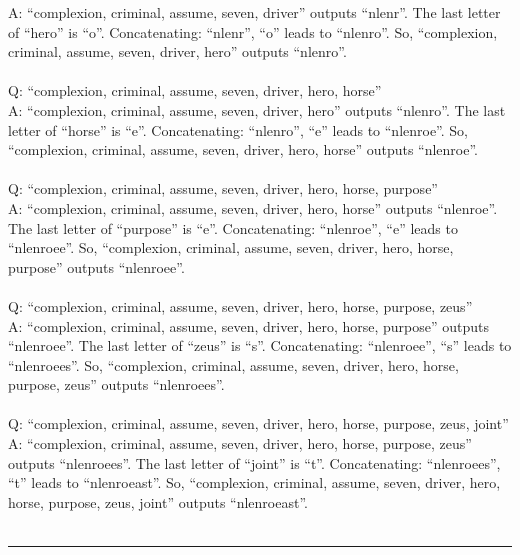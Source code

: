 {A: ``complexion, criminal, assume, seven, driver'' outputs ``nlenr''. The last letter of ``hero'' is ``o''. Concatenating: ``nlenr'', ``o'' leads to ``nlenro''. So, ``complexion, criminal, assume, seven, driver, hero'' outputs ``nlenro''. \\
\\
Q: ``complexion, criminal, assume, seven, driver, hero, horse'' \\
A: ``complexion, criminal, assume, seven, driver, hero'' outputs ``nlenro''. The last letter of ``horse'' is ``e''. Concatenating: ``nlenro'', ``e'' leads to ``nlenroe''. So, ``complexion, criminal, assume, seven, driver, hero, horse'' outputs ``nlenroe''. \\
\\
Q: ``complexion, criminal, assume, seven, driver, hero, horse, purpose'' \\
A: ``complexion, criminal, assume, seven, driver, hero, horse'' outputs ``nlenroe''. The last letter of ``purpose'' is ``e''. Concatenating: ``nlenroe'', ``e'' leads to ``nlenroee''. So, ``complexion, criminal, assume, seven, driver, hero, horse, purpose'' outputs ``nlenroee''. \\
\\
Q: ``complexion, criminal, assume, seven, driver, hero, horse, purpose, zeus'' \\
A: ``complexion, criminal, assume, seven, driver, hero, horse, purpose'' outputs ``nlenroee''. The last letter of ``zeus'' is ``s''. Concatenating: ``nlenroee'', ``s'' leads to ``nlenroees''. So, ``complexion, criminal, assume, seven, driver, hero, horse, purpose, zeus'' outputs ``nlenroees''. \\
\\
Q: ``complexion, criminal, assume, seven, driver, hero, horse, purpose, zeus, joint'' \\
A: ``complexion, criminal, assume, seven, driver, hero, horse, purpose, zeus'' outputs ``nlenroees''. The last letter of ``joint'' is ``t''. Concatenating: ``nlenroees'', ``t'' leads to ``nlenroeast''. So, ``complexion, criminal, assume, seven, driver, hero, horse, purpose, zeus, joint'' outputs ``nlenroeast''. \\
\\
\hrule \bigskip
}

